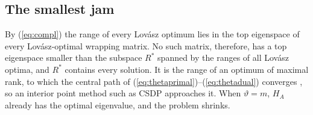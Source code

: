 \documentclass[11pt]{article}
\theoremstyle{definition}
\theoremstyle{remark}
\begin{document}
\subsection{The smallest jam}
\label{sec:minjam}

By (\ref{eq:compl}) the range of every Lov\'asz optimum lies in the top
eigenspace of every Lov\'asz-optimal wrapping matrix. No such matrix,
therefore, has a top eigenspace smaller than the subspace $R^*$ spanned by
the ranges of all Lov\'asz optima, and $R^*$ contains every solution. It is
the range of an optimum of maximal rank, to which the central path of
(\ref{eq:thetaprimal})--(\ref{eq:thetadual}) converges \cite{HKR02}, so an
interior point method such as CSDP approaches it. When $\vartheta=m$, $H_A$
already has the optimal eigenvalue, and the problem shrinks.
\end{document}
